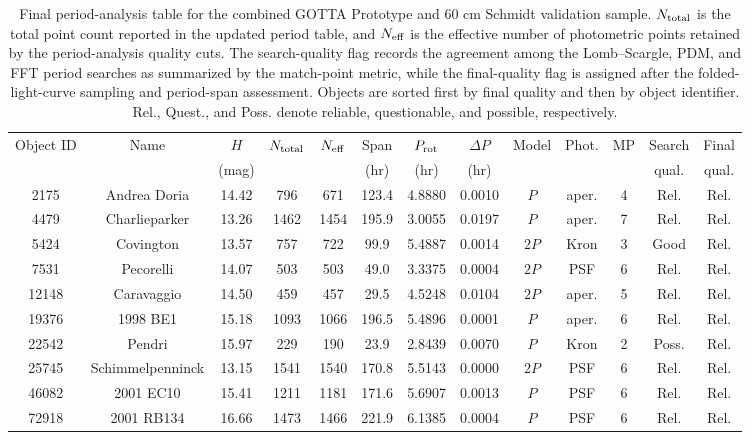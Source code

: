 \begin{table}[!p]
\centering
\caption{Final period-analysis table for the combined GOTTA Prototype and 60 cm Schmidt validation sample. $N_{\rm total}$ is the total point count reported in the updated period table, and $N_{\rm eff}$ is the effective number of photometric points retained by the period-analysis quality cuts. The search-quality flag records the agreement among the Lomb--Scargle, PDM, and FFT period searches as summarized by the match-point metric, while the final-quality flag is assigned after the folded-light-curve sampling and period-span assessment. Objects are sorted first by final quality and then by object identifier. Rel., Quest., and Poss. denote reliable, questionable, and possible, respectively.}
\label{tab:period_results}
\scriptsize
\setlength{\tabcolsep}{2.8pt}
\renewcommand{\arraystretch}{1.12}
\begin{tabular}{ccccccccccccc}
\toprule
Object ID & Name & $H$ & $N_{\rm total}$ & $N_{\rm eff}$ & Span & $P_{\rm rot}$ & $\Delta P$ & Model & Phot. & MP & Search & Final \\
 & & (mag) & & & (hr) & (hr) & (hr) & & & & qual. & qual. \\
\midrule
2175 & Andrea Doria & 14.42 & 796 & 671 & 123.4 & 4.8880 & 0.0010 & $P$ & aper. & 4 & Rel. & Rel. \\
4479 & Charlieparker & 13.26 & 1462 & 1454 & 195.9 & 3.0055 & 0.0197 & $P$ & aper. & 7 & Rel. & Rel. \\
5424 & Covington & 13.57 & 757 & 722 & 99.9 & 5.4887 & 0.0014 & $2P$ & Kron & 3 & Good & Rel. \\
7531 & Pecorelli & 14.07 & 503 & 503 & 49.0 & 3.3375 & 0.0004 & $2P$ & PSF & 6 & Rel. & Rel. \\
12148 & Caravaggio & 14.50 & 459 & 457 & 29.5 & 4.5248 & 0.0104 & $2P$ & aper. & 5 & Rel. & Rel. \\
19376 & 1998 BE1 & 15.18 & 1093 & 1066 & 196.5 & 5.4896 & 0.0001 & $P$ & aper. & 6 & Rel. & Rel. \\
22542 & Pendri & 15.97 & 229 & 190 & 23.9 & 2.8439 & 0.0070 & $P$ & Kron & 2 & Poss. & Rel. \\
25745 & Schimmelpenninck & 13.15 & 1541 & 1540 & 170.8 & 5.5143 & 0.0000 & $2P$ & PSF & 6 & Rel. & Rel. \\
46082 & 2001 EC10 & 15.41 & 1211 & 1181 & 171.6 & 5.6907 & 0.0013 & $P$ & PSF & 6 & Rel. & Rel. \\
72918 & 2001 RB134 & 16.66 & 1473 & 1466 & 221.9 & 6.1385 & 0.0004 & $P$ & PSF & 6 & Rel. & Rel. \\

\end{tabular}
\end{table}
